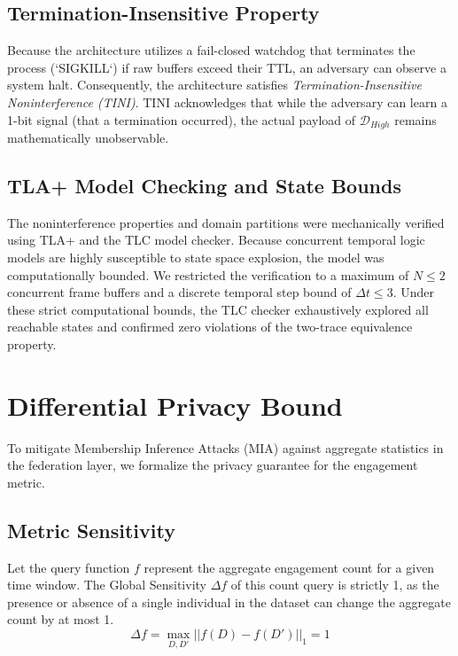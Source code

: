 \documentclass[conference]{IEEEtran}
\begin{document}
\subsection{Termination-Insensitive Property}
Because the architecture utilizes a fail-closed watchdog that terminates the process (`SIGKILL`) if raw buffers exceed their TTL, an adversary can observe a system halt. Consequently, the architecture satisfies \textit{Termination-Insensitive Noninterference (TINI)}. TINI acknowledges that while the adversary can learn a 1-bit signal (that a termination occurred), the actual payload of $\mathcal{D}_{High}$ remains mathematically unobservable.

\subsection{TLA+ Model Checking and State Bounds}
The noninterference properties and domain partitions were mechanically verified using TLA+ and the TLC model checker. Because concurrent temporal logic models are highly susceptible to state space explosion, the model was computationally bounded. We restricted the verification to a maximum of $N \le 2$ concurrent frame buffers and a discrete temporal step bound of $\Delta t \le 3$. Under these strict computational bounds, the TLC checker exhaustively explored all reachable states and confirmed zero violations of the two-trace equivalence property.

\section{Differential Privacy Bound}
To mitigate Membership Inference Attacks (MIA) against aggregate statistics in the federation layer, we formalize the privacy guarantee for the engagement metric.

\subsection{Metric Sensitivity}
Let the query function $f$ represent the aggregate engagement count for a given time window. The Global Sensitivity $\Delta f$ of this count query is strictly 1, as the presence or absence of a single individual in the dataset can change the aggregate count by at most 1.
\begin{equation}
\Delta f = \max_{D, D'} || f(D) - f(D') ||_1 = 1
\end{equation}
\end{document}

